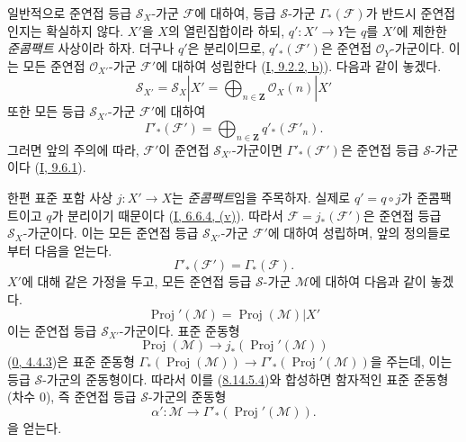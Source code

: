 \begin{env}[8.14.6]
\label{II.8.14.6-ko}
일반적으로 준연접 등급 $\mathcal{S}_X$-가군 $\mathcal{F}$에 대하여,
등급 $\mathcal{S}$-가군 $\Gamma_*(\mathcal{F})$가 반드시 준연접인지는
확실하지 않다. $X'$을 $X$의 열린집합이라 하되, $q':X'\to Y$는 $q$를
$X'$에 제한한 \emph{준콤팩트} 사상이라 하자. 더구나 $q'$은 분리이므로,
$q'_*(\mathcal{F}')$은 준연접 $\mathcal{O}_Y$-가군이다. 이는 모든 준연접
$\mathcal{O}_{X'}$-가군 $\mathcal{F}'$에 대하여 성립한다
(\hyperref[I.9.2.2-ko]{I, 9.2.2, b)}). 다음과 같이 놓겠다.
\begin{equation}
\label{II.8.14.6.1-ko}
  \mathcal{S}_{X'}=\mathcal{S}_X|X'
  =\bigoplus_{n\in\mathbf{Z}}\mathcal{O}_X(n)|X'
\tag{8.14.6.1}
\end{equation}
또한 모든 등급 $\mathcal{S}_{X'}$-가군 $\mathcal{F}'$에 대하여
\begin{equation}
\label{II.8.14.6.2-ko}
  \Gamma'_*(\mathcal{F}')=
  \bigoplus_{n\in\mathbf{Z}}q'_*(\mathcal{F}'_n).
\tag{8.14.6.2}
\end{equation}
그러면 앞의 주의에 따라, $\mathcal{F}'$이 준연접
$\mathcal{S}_{X'}$-가군이면 $\Gamma'_*(\mathcal{F}')$은 준연접 등급
$\mathcal{S}$-가군이다
(\hyperref[I.9.6.1-ko]{I, 9.6.1}).

한편 표준 포함 사상 $j:X'\to X$는 \emph{준콤팩트}임을 주목하자. 실제로
$q'=q\circ j$가 준콤팩트이고 $q$가 분리이기 때문이다
(\hyperref[I.6.6.4-ko]{I, 6.6.4, (v)}). 따라서
$\mathcal{F}=j_*(\mathcal{F}')$은 준연접 등급 $\mathcal{S}_X$-가군이다.
이는 모든 준연접 등급 $\mathcal{S}_{X'}$-가군 $\mathcal{F}'$에 대하여
성립하며, 앞의 정의들로부터 다음을 얻는다.
\begin{equation}
\label{II.8.14.6.3-ko}
  \Gamma'_*(\mathcal{F}')=\Gamma_*(\mathcal{F}).
\tag{8.14.6.3}
\end{equation}
$X'$에 대해 같은 가정을 두고, 모든 준연접 등급 $\mathcal{S}$-가군
$\mathcal{M}$에 대하여 다음과 같이 놓겠다.
\begin{equation}
\label{II.8.14.6.4-ko}
  \operatorname{Proj}'(\mathcal{M})
  =\operatorname{Proj}(\mathcal{M})|X'
\tag{8.14.6.4}
\end{equation}
이는 준연접 등급 $\mathcal{S}_{X'}$-가군이다. 표준 준동형
\[
  \operatorname{Proj}(\mathcal{M})\to
  j_*(\operatorname{Proj}'(\mathcal{M}))
\]
(\hyperref[0.4.4.3-ko]{0, 4.4.3})은 표준 준동형
$\Gamma_*(\operatorname{Proj}(\mathcal{M}))\to
\Gamma'_*(\operatorname{Proj}'(\mathcal{M}))$을 주는데, 이는 등급
$\mathcal{S}$-가군의 준동형이다. 따라서 이를
(\hyperref[II.8.14.5.4-ko]{8.14.5.4})와 합성하면 함자적인 표준 준동형
(차수 $0$), 즉 준연접 등급 $\mathcal{S}$-가군의 준동형
\begin{equation}
\label{II.8.14.6.5-ko}
  \alpha':\mathcal{M}\to
  \Gamma'_*(\operatorname{Proj}'(\mathcal{M})).
\tag{8.14.6.5}
\end{equation}
을 얻는다.
\end{env}

